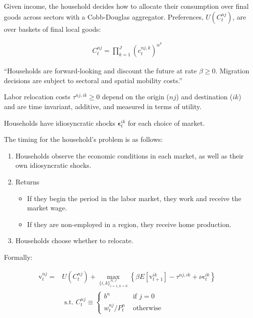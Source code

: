 \documentclass[10pt]{article}
\begin{document}
Given income, the household decides how to allocate 
their consumption over final goods across sectors 
with a Cobb-Douglas aggregator. Preferences,
$U\left(C_t^{n j}\right)$, are over 
baskets of final local goods:

\begin{align}
    C_t^{n j}=\prod_{k=1}^J\left(c_t^{n j, k}\right)^{\alpha^k}
\end{align}

``Households are forward-looking 
and discount the future at rate $\beta \geq 0$.
Migration decisions are subject to sectoral and spatial 
mobility costs.''

\begin{notes}[Assumption 1]
    Labor relocation costs $\tau^{n j, i k} \geq 0$ depend on the origin ($n j$) and destination ($ik$) and are time invariant, additive, and measured in terms of utility.
\end{notes}

Households have idiosyncratic shocks $\boldsymbol{\epsilon}_t^{i k}$ for each choice of market.


The timing for the household's problem is as follows:

\begin{enumerate}
    \item Households observe the economic conditions in each market, as well 
        as their own idiosyncratic shocks.
    \item Returns
        \begin{itemize}
            \item If they begin the period in the labor market, they work 
            and receive the market wage.
            \item  If they are non-employed in a region, they receive 
                home production.
        \end{itemize}
    \item Households choose whether to relocate.
\end{enumerate}

Formally:

\begin{align}
    \mathrm{v}_t^{n j}=&U\left(C_t^{n j}\right)+\max _{\{i, k\}_{i=1, k=0}^{N, J}}\left\{\beta E\left[\mathrm{v}_{t+1}^{i k}\right]-\tau^{n j, i k}+\nu \epsilon_t^{i k}\right\} \\
    & \text { s.t. } C_t^{n j} \equiv \begin{cases}b^n & \text { if } j=0 \\
    w_t^{n j} / P_t^n & \text { otherwise }\end{cases}
\end{align}
\end{document}
